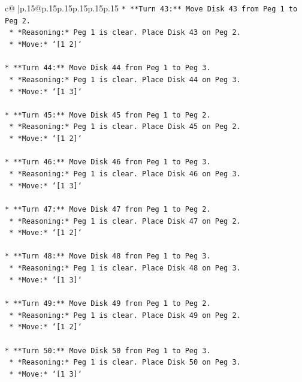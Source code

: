 \documentclass{article}
\begin{document}
{\begin{supertabular}{c@{$\;$}|p{.15\linewidth}@{}p{.15\linewidth}p{.15\linewidth}p{.15\linewidth}p{.15\linewidth}p{.15\linewidth}}
{{{\texttt{*   **Turn 43:** Move Disk 43 from Peg 1 to Peg 2.} \\
\texttt{    *   *Reasoning:* Peg 1 is clear. Place Disk 43 on Peg 2.} \\
\texttt{    *   *Move:* `{[}1 2{]}`} \\
\\ 
\texttt{*   **Turn 44:** Move Disk 44 from Peg 1 to Peg 3.} \\
\texttt{    *   *Reasoning:* Peg 1 is clear. Place Disk 44 on Peg 3.} \\
\texttt{    *   *Move:* `{[}1 3{]}`} \\
\\ 
\texttt{*   **Turn 45:** Move Disk 45 from Peg 1 to Peg 2.} \\
\texttt{    *   *Reasoning:* Peg 1 is clear. Place Disk 45 on Peg 2.} \\
\texttt{    *   *Move:* `{[}1 2{]}`} \\
\\ 
\texttt{*   **Turn 46:** Move Disk 46 from Peg 1 to Peg 3.} \\
\texttt{    *   *Reasoning:* Peg 1 is clear. Place Disk 46 on Peg 3.} \\
\texttt{    *   *Move:* `{[}1 3{]}`} \\
\\ 
\texttt{*   **Turn 47:** Move Disk 47 from Peg 1 to Peg 2.} \\
\texttt{    *   *Reasoning:* Peg 1 is clear. Place Disk 47 on Peg 2.} \\
\texttt{    *   *Move:* `{[}1 2{]}`} \\
\\ 
\texttt{*   **Turn 48:** Move Disk 48 from Peg 1 to Peg 3.} \\
\texttt{    *   *Reasoning:* Peg 1 is clear. Place Disk 48 on Peg 3.} \\
\texttt{    *   *Move:* `{[}1 3{]}`} \\
\\ 
\texttt{*   **Turn 49:** Move Disk 49 from Peg 1 to Peg 2.} \\
\texttt{    *   *Reasoning:* Peg 1 is clear. Place Disk 49 on Peg 2.} \\
\texttt{    *   *Move:* `{[}1 2{]}`} \\
\\ 
\texttt{*   **Turn 50:** Move Disk 50 from Peg 1 to Peg 3.} \\
\texttt{    *   *Reasoning:* Peg 1 is clear. Place Disk 50 on Peg 3.} \\
\texttt{    *   *Move:* `{[}1 3{]}`} \\
}}}
\end{supertabular}}
\end{document}
